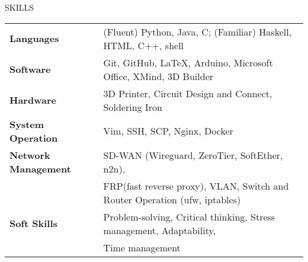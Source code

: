 \documentclass{resume} %
\begin{document}
\begin{rSection}{SKILLS}

\begin{tabular}{ @{} >{\bfseries}l @{\hspace{6ex}} l }
Languages & (Fluent) Python, Java, C; (Familiar) Haskell, HTML, C++, shell
\\
Software & Git, GitHub, \LaTeX, Arduino, Microsoft Office, XMind, 3D Builder
\\
Hardware & 3D Printer, Circuit Design and Connect, Soldering Iron
\\
System Operation & Vim, SSH, SCP, Nginx, Docker
\\
Network Management & SD-WAN (Wireguard, ZeroTier, SoftEther, n2n), \\ 
& FRP(fast reverse proxy),
VLAN, Switch and Router Operation (ufw, iptables)\\
Soft Skills & Problem-solving, Critical thinking, Stress management, Adaptability, \\ 
& Time management\\
\end{tabular}\\
\end{rSection}
\end{document}
